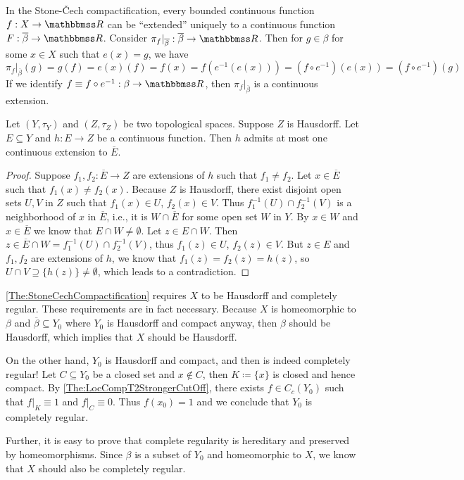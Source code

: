 \documentclass[screen,single]{techreport}
\numberwithin{equation}{section}
\begin{document}
\begin{remark}
	In the Stone-{\v{C}}ech compactification, every bounded continuous function $f:X \to \bbR$ can be ``extended'' uniquely to a continuous function $F : \overline{\beta} \to \bbR$.
	Consider $\pi_f |_{\overline{\beta}} : \overline{\beta} \to \bbR$.
	Then for $g \in \beta$ for some $x \in X$ such that $e(x) = g$, we have
	\[
	\pi_f|_{\overline{\beta}}(g) = g(f) = e(x)(f) = f(x) = f(e^{-1}(e(x))) = (f \circ e^{-1})(e(x)) = (f \circ e^{-1})(g)
	\]
	If we identify $f \equiv f \circ e^{-1} : \beta \to \bbR$, then $\pi_f|_{\overline{\beta}}$ is a continuous extension.
\end{remark}

\begin{proposition}\label{Prop:ContIntoT2AtMostOneExt}
	Let $(Y,\tau_Y)$ and $(Z,\tau_Z)$ be two topological spaces.
	Suppose $Z$ is Hausdorff.
	Let $E \subseteq Y$ and $h : E \to Z$ be a continuous function.
	Then $h$ admits at most one continuous extension to $\overline{E}$.
\end{proposition}
\begin{proof}
	Suppose $f_1,f_2 : \overline{E} \to Z$ are extensions of $h$ such that $f_1 \neq f_2$.
	Let $x \in \overline{E}$ such that $f_1(x) \neq f_2(x)$.
	Because $Z$ is Hausdorff, there exist disjoint open sets $U,V$ in $Z$ such that $f_1(x) \in U$, $f_2(x) \in V$.
	Thus $f_1^{-1}(U) \cap f_2^{-1}(V)$ is a neighborhood of $x$ in $\overline{E}$, i.e., it is $W \cap \overline{E}$ for some open set $W$ in $Y$.
	By $x \in W$ and $x \in \overline{E}$ we know that $E \cap W \neq \emptyset$.
	Let $z \in E \cap W$.
	Then $z \in \overline{E} \cap W = f_1^{-1}(U) \cap f_2^{-1}(V)$, thus $f_1(z) \in U$, $f_2(z) \in V$.
	But $z \in E$ and $f_1,f_2$ are extensions of $h$, we know that $f_1(z) = f_2(z)=h(z)$, so $U \cap V \supseteq \{ h(z) \} \neq \emptyset$, which leads to a contradiction.
\end{proof}

\begin{remark}\label{Rem:StoneCechNecessary}
	\cref{The:StoneCechCompactification} requires $X$ to be Hausdorff and completely regular.
	These requirements are in fact necessary.
	Because $X$ is homeomorphic to $\beta$ and $\overline{\beta} \subseteq Y_0$ where $Y_0$ is Hausdorff and compact anyway, then $\beta$ should be Hausdorff, which implies that $X$ should be Hausdorff.
	
	On the other hand, $Y_0$ is Hausdorff and compact, and then is indeed completely regular!
	Let $C \subseteq Y_0$ be a closed set and $x \not\in C$, then $K \coloneqq \{ x \}$ is closed and hence compact.
	By \cref{The:LocCompT2StrongerCutOff}, there exists $f \in C_c(Y_0)$ such that $f|_K \equiv 1$ and $f|_{C} \equiv 0$.
	Thus $f(x_0) = 1$ and we conclude that $Y_0$ is completely regular.
	
	Further, it is easy to prove that complete regularity is hereditary and preserved by homeomorphisms.
	Since $\beta$ is a subset of $Y_0$ and homeomorphic to $X$, we know that $X$ should also be completely regular.
\end{remark}
\end{document}
